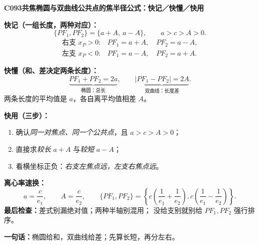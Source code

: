 \clearpage
\begin{summarybox}
\textbf{C093\quad 共焦椭圆与双曲线公共点的焦半径公式：快记／快懂／快用}

\textbf{快记（一组长度，两种对应）：}
\[
\boxed{\{PF_1,PF_2\}=\{a+A,\ a-A\}},\qquad a>c>A>0.
\]
\[
\boxed{\begin{array}{ll}
\text{右支 }x_P>0:&PF_1=a+A,\quad PF_2=a-A,\\[2pt]
\text{左支 }x_P<0:&PF_1=a-A,\quad PF_2=a+A.
\end{array}}
\]

\textbf{快懂（和、差决定两条长度）：}
\[
\underbrace{PF_1+PF_2=2a}_{\text{椭圆：总长}},\qquad
\underbrace{|PF_1-PF_2|=2A}_{\text{双曲线：长度差}}.
\]
两条长度的平均值是 $a$，各自离平均值相差 $A$。

\textbf{快用（三步）：}
\begin{enumerate}
\item 确认\emph{同一对焦点、同一个公共点}，且 $a>c>A>0$；
\item 直接求\emph{较长} $a+A$ 与\emph{较短} $a-A$；
\item 看横坐标正负：\emph{右支左焦点远，左支右焦点远}。
\end{enumerate}

\textbf{离心率速换：}
\[
a=\frac c{e_1},\qquad A=\frac c{e_2},\qquad
\{PF_1,PF_2\}=\left\{c\left(\frac1{e_1}+\frac1{e_2}\right),
 c\left(\frac1{e_1}-\frac1{e_2}\right)\right\}.
\]
\textbf{最后检查：}差式别漏绝对值；两种半轴别混用；
没给支别就别给 $PF_1,PF_2$ 强行排序。

\textbf{一句话：}椭圆给和，双曲线给差；先算长短，再分左右。
\end{summarybox}
